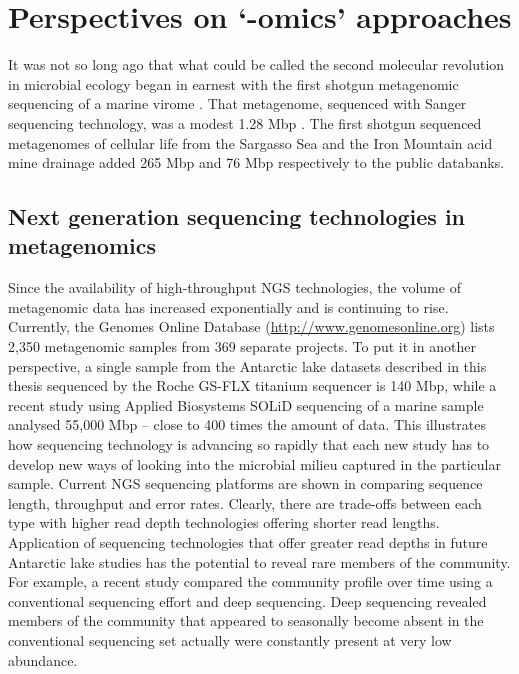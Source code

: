 \section{Perspectives on `-omics' approaches }
It was not so long ago that what could be called the second molecular revolution in microbial ecology began in earnest with the first shotgun metagenomic sequencing of a marine virome \cite{Breitbart2002}.
That metagenome, sequenced with Sanger sequencing technology, was a modest 1.28 Mbp \cite{Breitbart2002}.
The first shotgun sequenced metagenomes of cellular life from the Sargasso Sea \cite{Venter2004} and the Iron Mountain acid mine drainage \cite{Tyson2004} added 265 Mbp and 76 Mbp respectively to the public databanks.

\subsection{Next generation sequencing technologies in metagenomics}
Since the availability of high-throughput \ac{NGS} technologies, the volume of metagenomic data has increased exponentially and is continuing to rise.
Currently, the Genomes Online Database (\url{http://www.genomesonline.org}) lists 2,350 metagenomic samples from 369 separate projects.
To put it in another perspective, a single sample from the Antarctic lake datasets described in this thesis sequenced by the Roche GS-FLX titanium sequencer is 140 Mbp, while a recent study using Applied Biosystems SOLiD sequencing of a marine sample \cite{Iverson2012} analysed 55,000 Mbp -- close to 400 times the amount of data.
This illustrates how sequencing technology is advancing so rapidly that each new study has to develop new ways of looking into the microbial milieu captured in the particular sample.
Current \ac{NGS} sequencing platforms are shown in  comparing sequence length, throughput and error rates.
Clearly, there are trade-offs between each type with higher read depth technologies offering shorter read lengths. 
Application of sequencing technologies that offer greater read depths in future Antarctic lake studies has the potential to reveal rare members of the community.
For example, a recent study compared the community profile over time using a conventional sequencing effort and deep sequencing.
Deep sequencing revealed members of the community that appeared to seasonally become absent in the conventional sequencing set actually were constantly present at very low abundance. %


